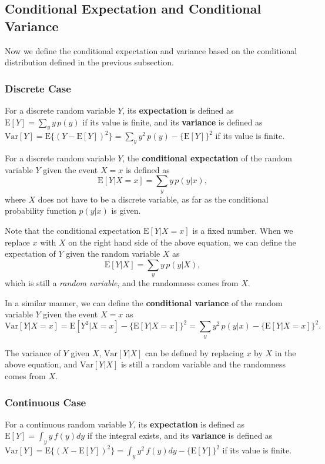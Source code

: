 \documentclass[]{book}
\theoremstyle{definition}
\theoremstyle{definition}
\theoremstyle{definition}
\theoremstyle{remark}
\begin{document}
\subsection{Conditional Expectation and Conditional
Variance}\label{conditional-expectation-and-conditional-variance}

Now we define the conditional expectation and variance based on the
conditional distribution defined in the previous subsection.

\subsubsection{Discrete Case}\label{discrete-case-1}

For a discrete random variable \(Y\), its \textbf{expectation} is
defined as \(\mathrm{E}[Y]=\sum_y y\,p(y)\) if its value is finite, and
its \textbf{variance} is defined as
\(\mathrm{Var}[Y]=\mathrm{E}\{(Y-\mathrm{E}[Y])^2\}=\sum_y y^2\,p(y)-\{\mathrm{E}[Y]\}^2\)
if its value is finite.

For a discrete random variable \(Y\), the \textbf{conditional
expectation} of the random variable \(Y\) given the event \(X=x\) is
defined as \[\mathrm{E}[Y|X=x]=\sum_y y\,p(y|x),\] where \(X\) does not
have to be a discrete variable, as far as the conditional probability
function \(p(y|x)\) is given.

Note that the conditional expectation \(\mathrm{E}[Y|X=x]\) is a fixed
number. When we replace \(x\) with \(X\) on the right hand side of the
above equation, we can define the expectation of \(Y\) given the random
variable \(X\) as \[\mathrm{E}[Y|X]=\sum_y y\,p(y|X),\] which is still a
\emph{random variable}, and the randomness comes from \(X\).

In a similar manner, we can define the \textbf{conditional variance} of
the random variable \(Y\) given the event \(X=x\) as
\[\mathrm{Var}[Y|X=x]=\mathrm{E}[Y^2|X=x]-\{\mathrm{E}[Y|X=x]\}^2=\sum_y y^2\,p(y|x)-\{\mathrm{E}[Y|X=x]\}^2.\]

The variance of \(Y\) given \(X\), \(\mathrm{Var}[Y|X]\) can be defined
by replacing \(x\) by \(X\) in the above equation, and
\(\mathrm{Var}[Y|X]\) is still a random variable and the randomness
comes from \(X\).

\subsubsection{Continuous Case}\label{continuous-case-1}

For a continuous random variable \(Y\), its \textbf{expectation} is
defined as \(\mathrm{E}[Y]=\int_y y\,f(y)dy\) if the integral exists,
and its \textbf{variance} is defined as
\(\mathrm{Var}[Y]=\mathrm{E}\{(X-\mathrm{E}[Y])^2\}=\int_y y^2\,f(y)dy-\{\mathrm{E}[Y]\}^2\)
if its value is finite.
\end{document}
